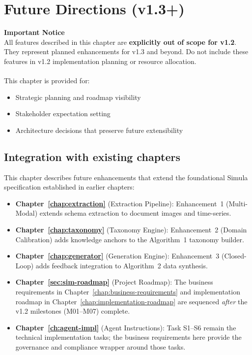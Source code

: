 \chapter{Future Directions (v1.3+)}
\label{chap:future-directions}

\begin{futurebox}
\textbf{Important Notice}\\
All features described in this chapter are \textbf{explicitly out of scope for v1.2}. They represent planned enhancements for v1.3 and beyond. Do not include these features in v1.2 implementation planning or resource allocation.\\
\\
This chapter is provided for:
\begin{itemize}
  \item Strategic planning and roadmap visibility
  \item Stakeholder expectation setting
  \item Architecture decisions that preserve future extensibility
\end{itemize}
\end{futurebox}

\section*{Integration with existing chapters}

This chapter describes future enhancements that extend the foundational Simula specification established in earlier chapters:

\begin{itemize}
  \item \textbf{Chapter~\ref{chap:extraction}} (Extraction Pipeline): Enhancement~1 
    (Multi-Modal) extends schema extraction to document images and time-series.
  \item \textbf{Chapter~\ref{chap:taxonomy}} (Taxonomy Engine): Enhancement~2 
    (Domain Calibration) adds knowledge anchors to the Algorithm~1 taxonomy builder.
  \item \textbf{Chapter~\ref{chap:generator}} (Generation Engine): Enhancement~3 
    (Closed-Loop) adds feedback integration to Algorithm~2 data synthesis.
  \item \textbf{Chapter~\ref{sec:sim-roadmap}} (Project Roadmap): The business 
    requirements in Chapter~\ref{chap:business-requirements} and implementation 
    roadmap in Chapter~\ref{chap:implementation-roadmap} are sequenced \emph{after} 
    the v1.2 milestones (M01--M07) complete.
  \item \textbf{Chapter~\ref{ch:agent-impl}} (Agent Instructions): Task S1--S6 
    remain the technical implementation tasks; the business requirements here 
    provide the governance and compliance wrapper around those tasks.
\end{itemize}

